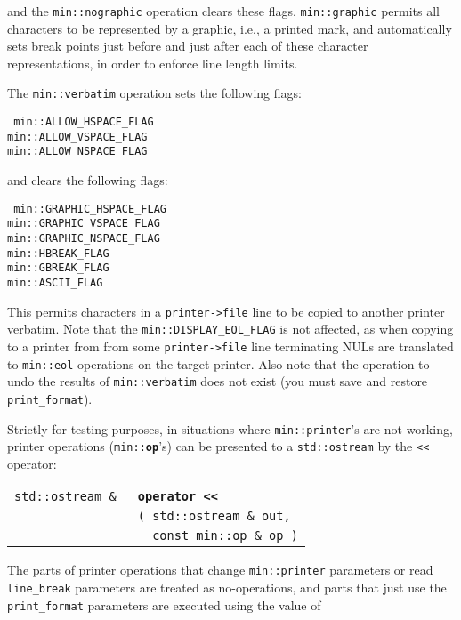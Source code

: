 \documentclass[12pt]{article}
\makeatletter
\newcommand{\TT}[1]{{\tt \bfseries #1}}
\newcommand{\ttindex}[1]{\index{#1@{\tt #1}}}
\newcommand{\ttomkey}[3]{\TT{operator #2}\index{#1@{\tt operator #2}!{#3}}}
\newcommand{\minindex}[1]{\ttindex{min::#1}\ttindex{#1}}
\newcommand{\EOL}{\penalty \exhyphenpenalty}
\newcommand{\LT}{{\tt <}}
\newenvironment{indpar}[1][0.3in]%
	{\begin{list}{}%
		     {\setlength{\itemsep}{0in}%
		      \setlength{\topsep}{0in}%
		      \setlength{\parsep}{1ex}%
		      \setlength{\labelwidth}{#1}%
		      \setlength{\leftmargin}{#1}%
		      \addtolength{\leftmargin}{\labelsep}}%
	 \item}%
	{\end{list}}
\newcommand{\LABEL}[1]{\label{#1}}
\newlength{\ARGBREAKLENGTH}
\newcommand{\ARGBREAK}[1][\ARGBREAKLENGTH]{\\&\hspace*{#1}}
\newcommand{\TTOMKEY}[3]{\ttomkey{#1}{#2}{#3}}
\newcommand{\MINKEY}[1]{{\tt \bf #1}\minindex{#1}}
\makeatother
\begin{document}
and the {\tt min::\EOL nographic} operation clears these flags.
{\tt min::\EOL graphic} permits all characters to be represented
by a graphic, i.e., a printed mark, and automatically sets break points
just before
and just after each of these character representations, in order to
enforce line length limits.

The {\tt min::\EOL verbatim} operation sets the following flags:
\begin{indpar}
\tt
min::ALLOW\_HSPACE\_FLAG \\
min::ALLOW\_VSPACE\_FLAG \\
min::ALLOW\_NSPACE\_FLAG
\end{indpar}

and clears the following flags:
\begin{indpar}
\tt
min::GRAPHIC\_HSPACE\_FLAG \\
min::GRAPHIC\_VSPACE\_FLAG \\
min::GRAPHIC\_NSPACE\_FLAG \\
min::HBREAK\_FLAG \\
min::GBREAK\_FLAG \\
min::ASCII\_FLAG
\end{indpar}

This permits characters in a {\tt printer->file} line to be copied
to another printer verbatim.  Note that
the {\tt min::\EOL DISPLAY\_\EOL EOL\_\EOL FLAG}
is not affected, as when copying to a printer from
from some {\tt printer->\EOL file}
line terminating NULs are translated to {\tt min::\EOL eol}
operations on the target printer.
Also note that the operation to undo the results
of {\tt min::\EOL verbatim} does not exist (you must save and restore
{\tt print\_\EOL format}).

Strictly for testing purposes, in situations where {\tt min::printer}'s
are not working, printer operations ({\tt min::}\MINKEY{op}'s)
can be presented to a {\tt std::\EOL ostream} by the
{\tt <{}<} operator:

\begin{indpar}[1em]\begin{tabular}{r@{}l}
\verb|std::ostream & |
    & \TTOMKEY{<<}{\LT\LT}{of {\tt std::ostream \&}}\ARGBREAK
      \verb|( std::ostream & out,|\ARGBREAK
      \verb|  const min::op & op )|
\LABEL{OPERATOR<<_OF_OSTREAM_AND_PRINTER_OP} \\
\end{tabular}\end{indpar}

The parts of printer operations that change {\tt min::\EOL printer}
parameters or read {\tt line\_\EOL break} parameters
are treated as no-operations, and parts that just
use the {\tt print\_\EOL format} parameters are executed using
the value of
\end{document}
